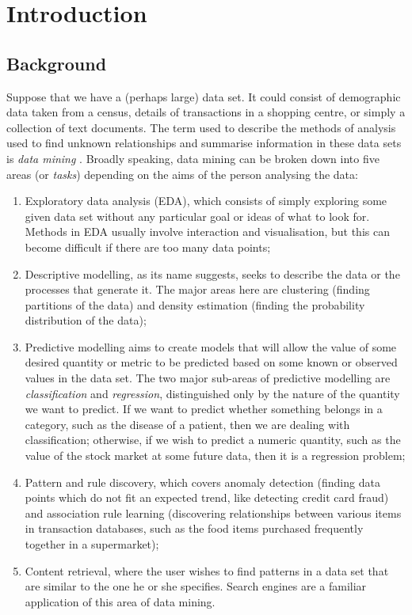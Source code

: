\chapter{Introduction}

\section{Background}
Suppose that we have a (perhaps large) data set. It could consist of
demographic data taken from a census, details of transactions in a shopping
centre, or simply a collection of text documents. The term used to describe
the methods of analysis used to find unknown relationships and summarise
information in these data sets is \textit{data mining} \citep{Hand2001}.
Broadly speaking,
data mining can be broken down into five areas (or \textit{tasks}) depending
on the aims of the person analysing the data:

\begin{enumerate}
\item Exploratory data analysis (EDA), which consists of simply exploring some
given data set without any particular goal or ideas of what to look for.
Methods in EDA usually involve interaction and visualisation, but this can
become difficult if there are too many data points;
\item Descriptive modelling, as its name suggests, seeks to describe the data
or the processes that generate it. The major areas here are clustering (finding
partitions of the data) and density estimation (finding the probability
distribution of the data);
\item Predictive modelling aims to create models that will allow the value of
some desired quantity or metric to be predicted based on some known or observed
values in the data set. The two major sub-areas of predictive modelling are
\textit{classification} and \textit{regression}, distinguished only by the
nature of the quantity we want to predict. If we want to predict whether
something belongs in a category, such as the disease of a patient, then we
are dealing with classification; otherwise, if we wish to predict a numeric
quantity, such as the value of the stock market at some future data, then
it is a regression problem;
\item Pattern and rule discovery, which covers anomaly detection (finding data
points which do not fit an expected trend, like detecting credit card fraud)
and association rule learning (discovering relationships between various items
in transaction databases, such as the food items purchased frequently together
in a supermarket);
\item Content retrieval, where the user wishes to find patterns in a data set
that are similar to the one he or she specifies. Search engines are a familiar
application of this area of data mining.
\end{enumerate}

